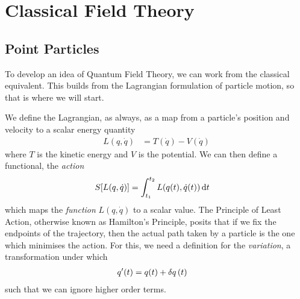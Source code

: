\documentclass[notes.tex]{subfiles}
\begin{document}
\chapter{Classical Field Theory}
\label{chap:rqft_cft}

\section{Point Particles}
\label{sec:rqft_cft_point-particles}
To develop an idea of Quantum Field Theory, we can work from the classical equivalent. 
This builds from the Lagrangian formulation of particle motion, so that is where we will start. 

We define the Lagrangian, as always, as a map from a particle's position and velocity to a scalar energy quantity
\begin{align*}
  L(q, \dot{q}) &= T(\dot{q}) - V(\dot{q})
\end{align*}
where $T$ is the kinetic energy and $V$ is the potential. 
We can then define a functional, the \emph{action} 
\begin{align*}
  S\qty[L(q, \dot{q})] &= \int_{t_1}^{t_2} L\qty(q(t), \dot{q}(t)) \dd{t}
\end{align*}
which maps the \emph{function} $L(q, \dot{q})$ to a scalar value.
The Principle of Least Action, otherwise known as Hamilton's Principle, posits that if we fix the endpoints of the trajectory, then the actual path taken by a particle is the one which minimises the action. 
For this, we need a definition for the \emph{variation}, a transformation under which 
\begin{align*}
  q^\prime(t) &= q(t) + \var{q}(t)
\end{align*}
such that we can ignore higher order terms. 
\end{document}
